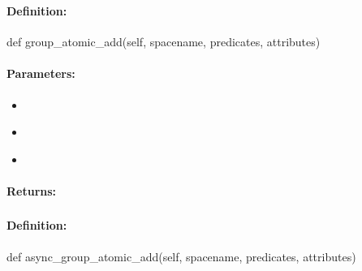 \pagebreak
\subsubsection{}
\label{api:python:group_atomic_add}


\paragraph{Definition:}
\begin{pythoncode}
def group_atomic_add(self, spacename, predicates, attributes)
\end{pythoncode}

\paragraph{Parameters:}
\begin{itemize}[noitemsep]
\item {}\\

\item {}\\

\item {}\\

\end{itemize}

\paragraph{Returns:}


\pagebreak
\subsubsection{}
\label{api:python:async_group_atomic_add}


\paragraph{Definition:}
\begin{pythoncode}
def async_group_atomic_add(self, spacename, predicates, attributes)
\end{pythoncode}

